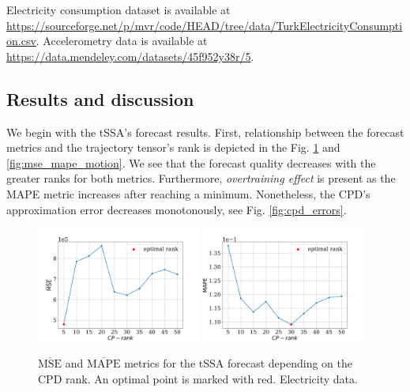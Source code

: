 \documentclass[referee, pdflatex, sn-mathphys-num]{sn-jnl}
\theoremstyle{definition}
\theoremstyle{plain}
\begin{document}
	Electricity consumption dataset is available at \url{https://sourceforge.net/p/mvr/code/HEAD/tree/data/TurkElectricityConsumption.csv}. Accelerometry data is available at \url{https://data.mendeley.com/datasets/45f952y38r/5}.
	
	\subsection{Results and discussion}
	
	We begin with the tSSA's forecast results. First, relationship between the forecast metrics and the trajectory tensor's rank is depicted in the Fig. \ref{fig:mse_mape_electr} and \ref{fig:mse_mape_motion}. We see that the forecast quality decreases with the greater ranks for both metrics. Furthermore, \emph{overtraining effect} is present as the MAPE metric increases after reaching a minimum. Nonetheless, the CPD's approximation error decreases monotonously, see Fig. \ref{fig:cpd_errors}.
	
	\begin{figure}[h]
		\centering
		\includegraphics[width=0.48\textwidth, keepaspectratio]{pred_MSE_rank_elec.png}
		\includegraphics[width=0.48\textwidth, keepaspectratio]{pred_MAPE_rank_elec.png}
		\caption{$ \overline{\text{MSE}} $ and $ \overline{\text{MAPE}} $ metrics for the tSSA forecast depending on the CPD rank. An optimal point is marked with red. Electricity data.}\label{fig:mse_mape_electr}
	\end{figure}
	
\end{document}
